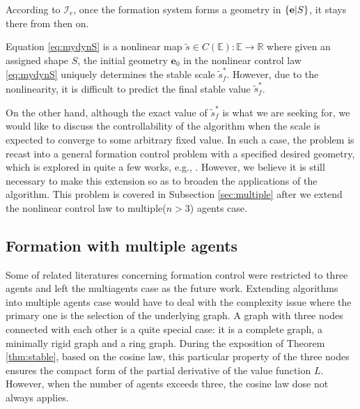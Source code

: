 \documentclass[times]{rncauth}
\newcommand{\be}{\ensuremath \mathbf{e}}
\begin{document}
According to $\mathcal{I}_{e}$, once the formation system forms a
geometry in $\{\be|S\}$, it stays there from then on.

Equation \eqref{eq:mydynS} is a nonlinear map $\tilde{s}\in
C(\mathbb{E}): \mathbb{E} \rightarrow \mathbb{R}$ where given an
assigned shape $S$, the
 initial geometry  $\mathbf{e}_0$ in the nonlinear control law
\eqref{eq:mydynS} uniquely determines the stable scale
$\tilde{s}^*_f$.  However, due to the nonlinearity,  it is difficult
to predict the final stable value $\tilde{s}^*_f$.


On the other hand, although the exact value of $\tilde{s}^*_f$ is
what we are seeking for, we would like to discuss the
controllability of the algorithm when the scale is expected to
converge to some arbitrary fixed value. In such a case, the problem
is recast into a general formation control problem with a specified
desired geometry, which is explored in quite a few works, e.g.,
\cite{Belta04optimal}. However, we believe it is still necessary to
make this extension so as to broaden the applications of the
algorithm. This problem is covered in Subsection \ref{sec:multiple}
after we extend the nonlinear control law to multiple($n>3$) agents
case.

\subsection{Formation with multiple agents}
Some of related literatures concerning formation control were
restricted to three agents\cite{Basiri10angleonly,Bhatt09geometric}
and left the multiagents case as the future work. Extending
algorithms into multiple agents case would have to deal with the
complexity issue where the primary one is the selection of the
underlying graph. A graph with three nodes connected with each other
is a quite special case: it is a complete graph, a minimally rigid
graph and a ring graph. During the exposition of Theorem
\ref{thm:stable}, based on the cosine law, this particular property
of the three nodes ensures the compact form of the partial
derivative of the value function $L$. However, when the number of
agents exceeds three, the cosine law dose not always applies.
\end{document}
